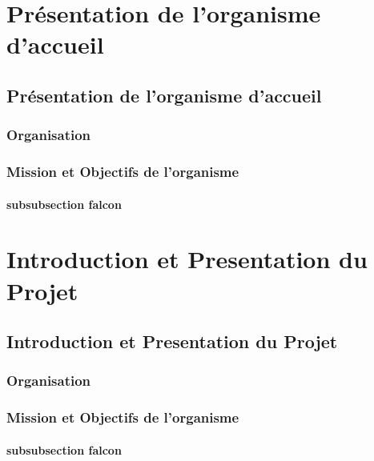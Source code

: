 \documentclass{report}
\let\oldchapter\chapter
\renewcommand{\chapter}[1]{\oldchapter{#1}}
\begin{document}
	\restoregeometry
		
	\renewcommand{\chaptername}{}
	
	\fancyhead[L]{\leftmark \\ \vspace{30pt}}
	\chapter{Présentation de l'organisme d'accueil}
	
	\section{Présentation de l'organisme d'accueil}
	
	\subsection{Organisation}
	\subsection{Mission et Objectifs de l'organisme}
	\subsubsection{subsubsection falcon}
	
	\lipsum[1-10]
	\lipsum[1-10]
	
	\chapter{Introduction et Presentation du Projet}
	
	\section{Introduction et Presentation du Projet}
	
	\subsection{Organisation}
	\subsection{Mission et Objectifs de l'organisme}
	\subsubsection{subsubsection falcon}
	\lipsum[1-10]
	\lipsum[1-10]
	
\end{document}

